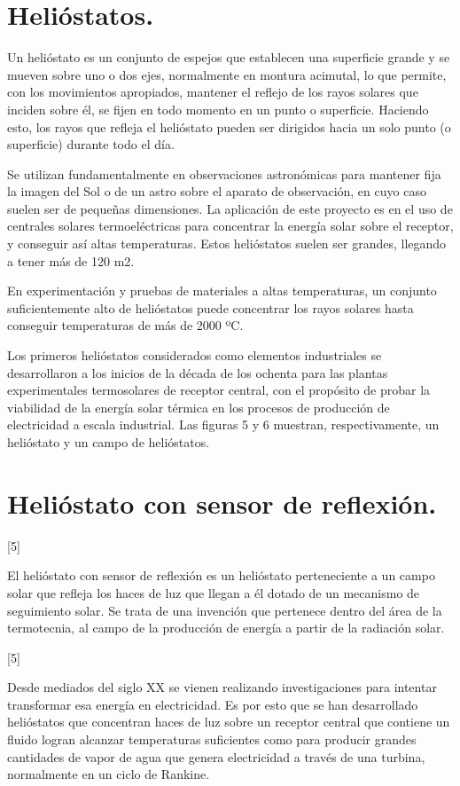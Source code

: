 \documentclass[12pt]{article}
\begin{document}
\section{Helióstatos.}

Un helióstato es un conjunto de espejos que establecen una superficie grande y se mueven sobre uno o dos ejes, normalmente en montura acimutal, lo que permite, con los movimientos apropiados, mantener el reflejo de los rayos solares que inciden sobre él, se fijen en todo momento en un punto o superficie. Haciendo esto, los rayos que refleja el helióstato pueden ser dirigidos hacia un solo punto (o superficie) durante todo el día.

Se utilizan fundamentalmente en observaciones astronómicas para mantener fija la imagen del Sol o de un astro sobre el aparato de observación, en cuyo caso suelen ser de pequeñas dimensiones. La aplicación de este proyecto es en el uso de centrales solares termoeléctricas para concentrar la energía solar sobre el receptor, y conseguir así altas temperaturas. Estos helióstatos suelen ser grandes, llegando a tener más de 120 m2.

En experimentación y pruebas de materiales a altas temperaturas, un conjunto suficientemente alto de helióstatos puede concentrar los rayos solares hasta conseguir temperaturas de más de 2000 ºC.

Los primeros helióstatos considerados como elementos industriales se desarrollaron a los inicios de la década de los ochenta para las plantas experimentales termosolares de receptor central, con el propósito de probar la viabilidad de la energía solar térmica en los procesos de producción de electricidad a escala industrial. Las figuras 5 y 6 muestran, respectivamente, un helióstato y un campo de helióstatos.

\section{Helióstato con sensor de reflexión.}

[5]

El helióstato con sensor de reflexión es un helióstato perteneciente a un campo solar que refleja los haces de luz que llegan a él dotado de un mecanismo de seguimiento solar. Se trata de una invención que pertenece dentro del área de la termotecnia, al campo de la producción de energía a partir de la radiación solar.

[5]

Desde mediados del siglo XX se vienen realizando investigaciones para intentar transformar esa energía en electricidad. Es por esto que se han desarrollado helióstatos que concentran haces de luz sobre un receptor central que contiene un fluido logran alcanzar temperaturas suficientes como para producir grandes cantidades de vapor de agua que genera electricidad a través de una turbina, normalmente en un ciclo de Rankine.
\end{document}
